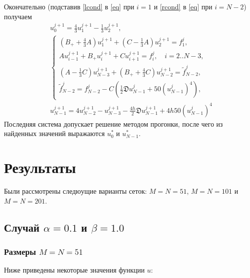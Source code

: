 \documentclass[a4paper,12pt]{article}
\begin{document}
Окончательно (подставив \cref{lcond} в \cref{eq} при \(i=1\) и \cref{rcond} в \cref{eq} при \(i=N-2\)) получаем
\begin{align*}
   & u_{0}^{j+1} = \frac{4}{3}u_{1}^{j+1} - \frac{1}{3} u_{2}^{j+1},                                                                         \\
   & \begin{cases}
       \left(B_{+} + \frac{4}{3}A\right) u_{1}^{j+1} + \left(C - \frac{1}{3}A\right) u_{2}^{j+1} = f_{1}^{j},               \\
       A u_{i-1}^{j+1} + B_{+} u_{i}^{j+1} + C u_{i+1}^{j+1} =  f_{i}^{j}, \quad i=2..N-3,                                  \\
       \left(A - \frac{1}{3}C\right) u_{N-3}^{j+1} + \left(B_{+} + \frac{4}{3}C\right) u_{N-2}^{j+1} = \tilde{f}_{N-2}^{j}, \\
       \tilde{f}_{N-2}^{j} = f_{N-2}^{j} - C\left(\frac{1}{2}\mathfrak{D} u_{N-1}^{j} + 50\left(u_{N-1}^{j}\right)^4\right),
     \end{cases} \\
   & u_{N-1}^{j+1}= 4u_{N-2}^{j+1} - u_{N-3}^{j+1}-\frac{4h}{2}\mathfrak{D} u_{N-1}^{j+1} + 4h50\left(u_{N-1}^{j}\right)^4 
\end{align*}
Последняя система допускает решение методом прогонки, после чего из найденных значений выражаются \(u_{0}^{*}\) и \(u_{N-1}^{*}\).
\section*{Результаты}
Были рассмотрены следюущие варианты сеток: \(M=N=51\), \(M=N=101\) и \(M=N=201\).

\subsection*{Случай \(\alpha=0.1\) и \(\beta=1.0\)}

\subsubsection*{Размеры \(M=N=51\)}

Ниже приведены некоторые значения функции \(u\):
\end{document}
